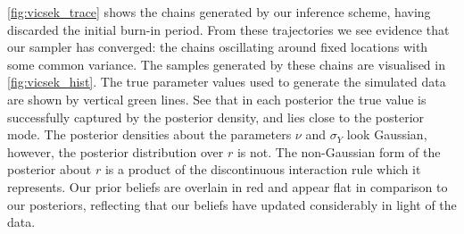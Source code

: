 \cref{fig:vicsek_trace} shows the chains generated by our inference scheme,
having discarded the initial burn-in period. From these trajectories we see
evidence that our sampler has converged: the chains oscillating around fixed
locations with some common variance. The samples generated by these chains are
visualised in \cref{fig:vicsek_hist}. The true parameter values used to
generate the simulated data are shown by vertical green lines. See that in each
posterior the true value is successfully captured by the posterior density, and
lies close to the posterior mode. The posterior densities about the parameters
$\nu$ and $\sigma_Y$ look Gaussian, however, the posterior distribution over
$r$ is not. The non-Gaussian form of the posterior about $r$ is a product of
the discontinuous interaction rule which it represents. Our prior beliefs are
overlain in red and appear flat in comparison to our posteriors, reflecting
that our beliefs have updated considerably in light of the data.

